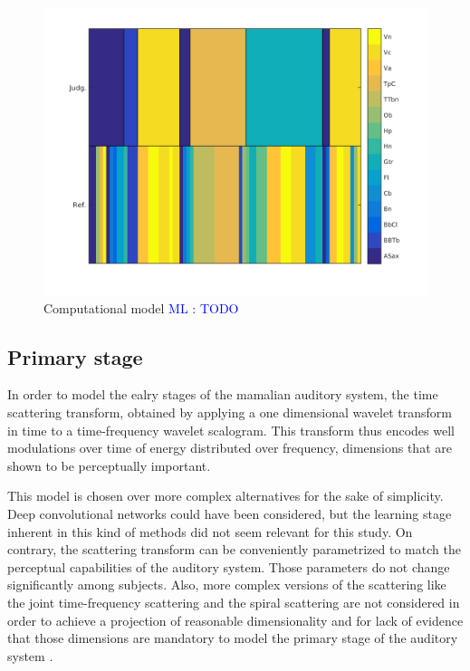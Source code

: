 \documentclass{article}
\newcommand{\ml}[1]{\textcolor{blue}{ML : #1}}
\begin{document}
\begin{figure}
\center
\includegraphics[width = \textwidth]{figures/groupInstruments.png}
\caption{Computational model \ml{TODO}}
\label{fig:model}
\end{figure}

\subsection{Primary stage}

In order to model the ealry stages of the mamalian auditory system, the time scattering transform, obtained by applying a one dimensional
wavelet transform in time to a time-frequency wavelet scalogram. This transform thus encodes well modulations over time of energy distributed over frequency, dimensions that are shown to be perceptually important.

This model is chosen over more complex alternatives for the sake of simplicity. Deep convolutional networks could have been considered, but the learning stage inherent in this kind of methods did not seem relevant for this study. On contrary, the scattering transform can be conveniently parametrized to match the perceptual capabilities of the auditory system. Those parameters do not change significantly among subjects. Also, more complex versions of the scattering like the joint time-frequency scattering \cite{waspaa} and the spiral scattering are not considered in order to achieve a projection of reasonable dimensionality and for lack of evidence that those dimensions are mandatory to model the primary stage of the auditory system \cite{dau}.
\end{document}
